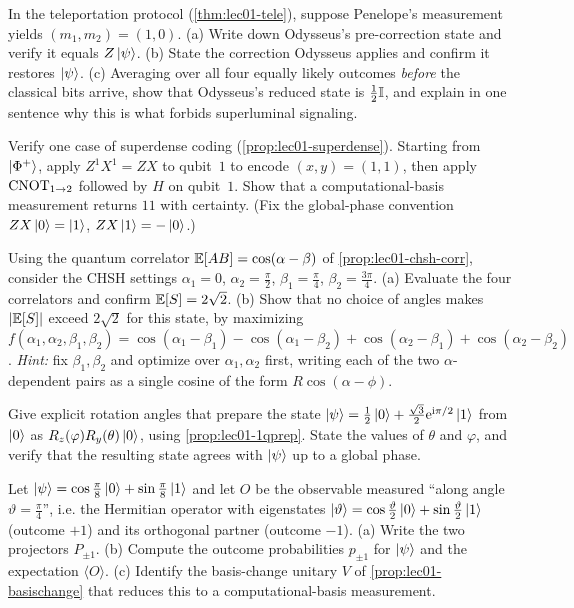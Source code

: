 \begin{exercise}\label{ex:lec01-10}
In the teleportation protocol (\cref{thm:lec01-tele}), suppose Penelope's measurement
yields $(m_1,m_2)=(1,0)$. (a) Write down Odysseus's pre-correction state and verify it
equals $Z\ket{\psi}$. (b) State the correction Odysseus applies and confirm it restores
$\ket{\psi}$. (c) Averaging over all four equally likely outcomes \emph{before} the
classical bits arrive, show that Odysseus's reduced state is $\tfrac12\mathbb{I}$, and explain in
one sentence why this is what forbids superluminal signaling.
\end{exercise}

\begin{exercise}\label{ex:lec01-11}
Verify one case of superdense coding (\cref{prop:lec01-superdense}). Starting from
$\ket{\Phi^{+}}$, apply $Z^{1}X^{1}=Z X$ to qubit~$1$ to encode $(x,y)=(1,1)$, then
apply $\mathrm{CNOT}_{1\to2}$ followed by $H$ on qubit~$1$. Show that a computational-basis
measurement returns $11$ with certainty. (Fix the global-phase convention $ZX\ket{0}
=\ket{1}$, $ZX\ket{1}=-\ket{0}$.)
\end{exercise}

\begin{exercise}\label{ex:lec01-12}
Using the quantum correlator $\mathbb{E}[AB]=\cos(\alpha-\beta)$ of
\cref{prop:lec01-chsh-corr}, consider the CHSH settings $\alpha_1=0$,
$\alpha_2=\tfrac{\pi}{2}$, $\beta_1=\tfrac{\pi}{4}$, $\beta_2=\tfrac{3\pi}{4}$.
(a) Evaluate the four correlators and confirm $\mathbb{E}[S]=2\sqrt2$. (b) Show that no choice
of angles makes $\left\lvert \mathbb{E}[S] \right\rvert$ exceed $2\sqrt2$ for this state, by maximizing
$f(\alpha_1,\alpha_2,\beta_1,\beta_2)=\cos(\alpha_1-\beta_1)-\cos(\alpha_1-\beta_2)
+\cos(\alpha_2-\beta_1)+\cos(\alpha_2-\beta_2)$. \emph{Hint:} fix
$\beta_1,\beta_2$ and optimize over $\alpha_1,\alpha_2$ first, writing each of the two
$\alpha$-dependent pairs as a single cosine of the form $R\cos(\alpha-\phi)$.
\end{exercise}

\begin{exercise}\label{ex:lec01-13}
Give explicit rotation angles that prepare the state
$\ket{\psi}=\tfrac{1}{2}\ket{0}+\tfrac{\sqrt3}{2}\mathrm{e}^{\mathrm{i}\pi/2}\ket{1}$ from $\ket{0}$
as $R_{z}(\varphi)R_{y}(\theta)\ket{0}$, using \cref{prop:lec01-1qprep}. State the
values of $\theta$ and $\varphi$, and verify that the resulting state agrees with
$\ket{\psi}$ up to a global phase.
\end{exercise}

\begin{exercise}\label{ex:lec01-14}
Let $\ket{\psi}=\cos\tfrac{\pi}{8}\ket{0}+\sin\tfrac{\pi}{8}\ket{1}$ and let $O$ be the
observable measured ``along angle $\vartheta=\tfrac{\pi}{4}$'', i.e. the Hermitian
operator with eigenstates $\ket{\vartheta}=\cos\tfrac{\vartheta}{2}\ket{0}+\sin\tfrac{\vartheta}{2}\ket{1}$
(outcome $+1$) and its orthogonal partner (outcome $-1$). (a) Write the two projectors
$P_{\pm1}$. (b) Compute the outcome probabilities $p_{\pm1}$ for $\ket{\psi}$ and the
expectation $\langle O\rangle$. (c) Identify the basis-change unitary $V$ of
\cref{prop:lec01-basischange} that reduces this to a computational-basis measurement.
\end{exercise}

